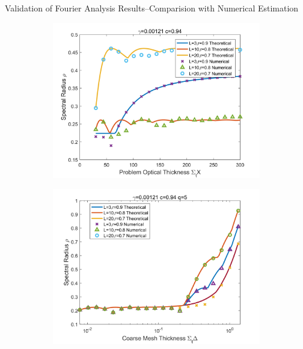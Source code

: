 \begin{frame}{Validation of Fourier Analysis Results--Comparision with Numerical Estimation}
\vspace{-2em}
 \begin{figure}
	\centering
	\captionsetup[subfigure]{justification=centering}
	\begin{subfigure}[t]{0.4\textwidth}
		\centering
		\includegraphics[width=\textwidth]{Texfile/Figure/TheovN_CT.png}
	\end{subfigure}
	\begin{subfigure}[t]{0.4\textwidth}
		\centering
		\includegraphics[width=\textwidth]{Texfile/Figure//TheovN_DT.png}
	\end{subfigure}
\end{figure} 


\end{frame}
